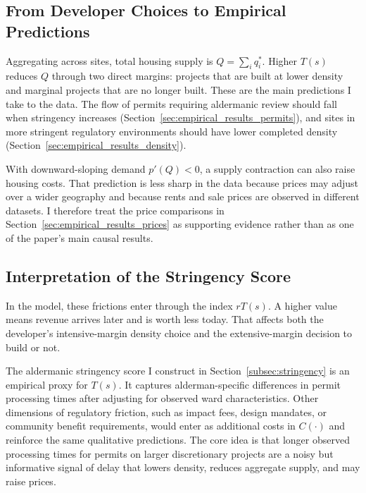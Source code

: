 \subsection{From Developer Choices to Empirical Predictions}

Aggregating across sites, total housing supply is $Q = \sum_i q_i^*$.
Higher $T(s)$ reduces $Q$ through two direct margins: projects that are built at lower density and marginal projects that are no longer built.
These are the main predictions I take to the data.
The flow of permits requiring aldermanic review should fall when stringency increases (Section~\ref{sec:empirical_results_permits}), and sites in more stringent regulatory environments should have lower completed density (Section~\ref{sec:empirical_results_density}).

With downward-sloping demand $p'(Q) < 0$, a supply contraction can also raise housing costs.
That prediction is less sharp in the data because prices may adjust over a wider geography and because rents and sale prices are observed in different datasets.
I therefore treat the price comparisons in Section~\ref{sec:empirical_results_prices} as supporting evidence rather than as one of the paper's main causal results.

\subsection{Interpretation of the Stringency Score}

In the model, these frictions enter through the index $rT(s)$.
A higher value means revenue arrives later and is worth less today.
That affects both the developer's intensive-margin density choice and the extensive-margin decision to build or not.

The aldermanic stringency score I construct in Section~\ref{subsec:stringency} is an empirical proxy for $T(s)$.
It captures alderman-specific differences in permit processing times after adjusting for observed ward characteristics.
Other dimensions of regulatory friction, such as impact fees, design mandates, or community benefit requirements, would enter as additional costs in $C(\cdot)$ and reinforce the same qualitative predictions.
The core idea is that longer observed processing times for permits on larger discretionary projects are a noisy but informative signal of delay that lowers density, reduces aggregate supply, and may raise prices.
